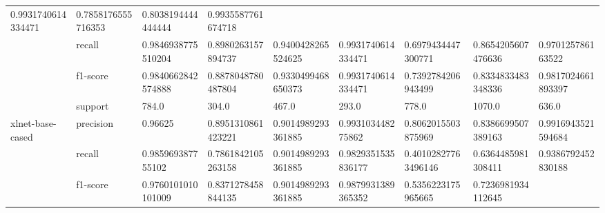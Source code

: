 \begin{landscape}
\begin{table}[]
{\begin{tabular}{@{}lllllllll@{}}
  \multicolumn{1}{l|}{0.9931740614334471} &
  \multicolumn{1}{l|}{0.7858176555716353} &
  \multicolumn{1}{l|}{0.8038194444444444} &
  \multicolumn{1}{l|}{0.9935587761674718} \\ \cmidrule(l){2-9} 
\multicolumn{1}{|l|}{} &
  \multicolumn{1}{l|}{recall} &
  \multicolumn{1}{l|}{0.9846938775510204} &
  \multicolumn{1}{l|}{0.8980263157894737} &
  \multicolumn{1}{l|}{0.9400428265524625} &
  \multicolumn{1}{l|}{0.9931740614334471} &
  \multicolumn{1}{l|}{0.6979434447300771} &
  \multicolumn{1}{l|}{0.8654205607476636} &
  \multicolumn{1}{l|}{0.970125786163522} \\ \cmidrule(l){2-9} 
\multicolumn{1}{|l|}{} &
  \multicolumn{1}{l|}{f1-score} &
  \multicolumn{1}{l|}{0.9840662842574888} &
  \multicolumn{1}{l|}{0.8878048780487804} &
  \multicolumn{1}{l|}{0.9330499468650373} &
  \multicolumn{1}{l|}{0.9931740614334471} &
  \multicolumn{1}{l|}{0.7392784206943499} &
  \multicolumn{1}{l|}{0.8334833483348336} &
  \multicolumn{1}{l|}{0.9817024661893397} \\ \cmidrule(l){2-9} 
\multicolumn{1}{|l|}{} &
  \multicolumn{1}{l|}{support} &
  \multicolumn{1}{l|}{784.0} &
  \multicolumn{1}{l|}{304.0} &
  \multicolumn{1}{l|}{467.0} &
  \multicolumn{1}{l|}{293.0} &
  \multicolumn{1}{l|}{778.0} &
  \multicolumn{1}{l|}{1070.0} &
  \multicolumn{1}{l|}{636.0} \\ \midrule
\multicolumn{1}{|l|}{\multirow{4}{*}{xlnet-base-cased}} &
  \multicolumn{1}{l|}{precision} &
  \multicolumn{1}{l|}{0.96625} &
  \multicolumn{1}{l|}{0.8951310861423221} &
  \multicolumn{1}{l|}{0.9014989293361885} &
  \multicolumn{1}{l|}{0.993103448275862} &
  \multicolumn{1}{l|}{0.8062015503875969} &
  \multicolumn{1}{l|}{0.8386699507389163} &
  \multicolumn{1}{l|}{0.9916943521594684} \\ \cmidrule(l){2-9} 
\multicolumn{1}{|l|}{} &
  \multicolumn{1}{l|}{recall} &
  \multicolumn{1}{l|}{0.985969387755102} &
  \multicolumn{1}{l|}{0.7861842105263158} &
  \multicolumn{1}{l|}{0.9014989293361885} &
  \multicolumn{1}{l|}{0.9829351535836177} &
  \multicolumn{1}{l|}{0.40102827763496146} &
  \multicolumn{1}{l|}{0.6364485981308411} &
  \multicolumn{1}{l|}{0.9386792452830188} \\ \cmidrule(l){2-9} 
\multicolumn{1}{|l|}{} &
  \multicolumn{1}{l|}{f1-score} &
  \multicolumn{1}{l|}{0.9760101010101009} &
  \multicolumn{1}{l|}{0.8371278458844135} &
  \multicolumn{1}{l|}{0.9014989293361885} &
  \multicolumn{1}{l|}{0.9879931389365352} &
  \multicolumn{1}{l|}{0.5356223175965665} &
  \multicolumn{1}{l|}{0.7236981934112645} &

\end{tabular}}
\end{table}
\end{landscape}

